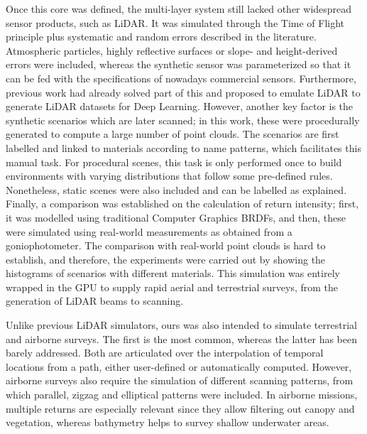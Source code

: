 Once this core was defined, the multi-layer system still lacked other widespread sensor products, such as LiDAR. It was simulated through the Time of Flight principle plus systematic and random errors described in the literature. Atmospheric particles, highly reflective surfaces or slope- and height-derived errors were included, whereas the synthetic sensor was parameterized so that it can be fed with the specifications of nowadays commercial sensors. Furthermore, previous work had already solved part of this and proposed to emulate LiDAR to generate LiDAR datasets for Deep Learning. However, another key factor is the synthetic scenarios which are later scanned; in this work, these were procedurally generated to compute a large number of point clouds. The scenarios are first labelled and linked to materials according to name patterns, which facilitates this manual task. For procedural scenes, this task is only performed once to build environments with varying distributions that follow some pre-defined rules. Nonetheless, static scenes were also included and can be labelled as explained. Finally, a comparison was established on the calculation of return intensity; first, it was modelled using traditional Computer Graphics BRDFs, and then, these were simulated using real-world measurements as obtained from a goniophotometer. The comparison with real-world point clouds is hard to establish, and therefore, the experiments were carried out by showing the histograms of scenarios with different materials. This simulation was entirely wrapped in the GPU to supply rapid aerial and terrestrial surveys, from the generation of LiDAR beams to scanning.

Unlike previous LiDAR simulators, ours was also intended to simulate terrestrial and airborne surveys. The first is the most common, whereas the latter has been barely addressed. Both are articulated over the interpolation of temporal locations from a path, either user-defined or automatically computed. However, airborne surveys also require the simulation of different scanning patterns, from which parallel, zigzag and elliptical patterns were included. In airborne missions, multiple returns are especially relevant since they allow filtering out canopy and vegetation, whereas bathymetry helps to survey shallow underwater areas. 

